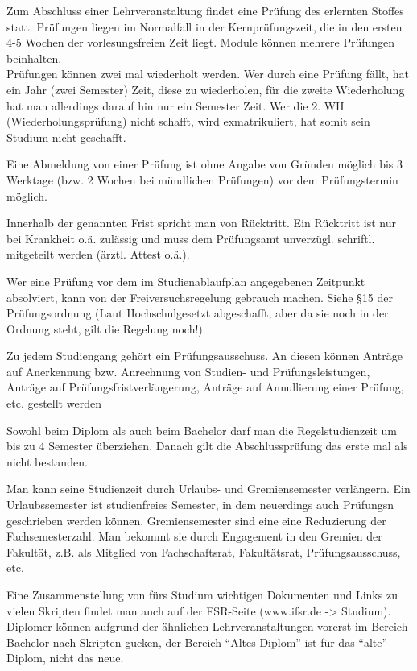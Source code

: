 \documentclass[a4paper,12pt]{report}
\begin{document}
\begin{itemize*}
\item Zum Abschluss einer Lehrveranstaltung findet eine Prüfung des erlernten Stoffes statt. Prüfungen liegen im Normalfall in der Kernprüfungszeit, die in den ersten 4-5 Wochen der vorlesungsfreien Zeit liegt. Module können mehrere Prüfungen beinhalten.\\
Prüfungen können zwei mal wiederholt werden. Wer durch eine Prüfung fällt, hat ein Jahr (zwei Semester) Zeit, diese zu wiederholen, für die zweite Wiederholung hat man allerdings darauf hin nur ein Semester Zeit. Wer die 2. WH (Wiederholungsprüfung) nicht schafft, wird exmatrikuliert, hat somit sein Studium nicht geschafft.
\item Eine Abmeldung von einer Prüfung ist ohne Angabe von Gründen möglich bis 3 Werktage (bzw. 2 Wochen bei mündlichen Prüfungen) vor dem Prüfungstermin möglich.
\item Innerhalb der genannten Frist spricht man von Rücktritt. Ein Rücktritt ist nur bei Krankheit o.ä. zulässig und muss dem Prüfungsamt unverzügl. schriftl. mitgeteilt werden (ärztl. Attest o.ä.).
\item Wer eine Prüfung vor dem im Studienablaufplan angegebenen Zeitpunkt absolviert, kann von der Freiversuchsregelung gebrauch machen. Siehe \S15 der Prüfungsordnung (Laut Hochschulgesetzt abgeschafft, aber da sie noch in der Ordnung steht, gilt die Regelung noch!).
\item Zu jedem Studiengang gehört ein Prüfungsausschuss. An diesen können Anträge auf Anerkennung bzw. Anrechnung von Studien- und Prüfungsleistungen, Anträge auf Prüfungsfristverlängerung, Anträge auf Annullierung einer Prüfung, etc. gestellt werden
\item Sowohl beim Diplom als auch beim Bachelor darf man die Regelstudienzeit um bis zu 4 Semester überziehen. Danach gilt die Abschlussprüfung das erste mal als nicht bestanden.
\item Man kann seine Studienzeit durch Urlaubs- und Gremiensemester verlängern. Ein Urlaubssemester ist studienfreies Semester, in dem neuerdings auch Prüfungsn geschrieben werden können. Gremiensemester sind eine eine Reduzierung der Fachsemesterzahl. Man bekommt sie durch Engagement in den Gremien der Fakultät, z.B. als Mitglied von Fachschaftsrat, Fakultätsrat, Prüfungsausschuss, etc.
\item Eine Zusammenstellung von fürs Studium wichtigen Dokumenten und Links zu vielen Skripten findet man auch auf der FSR-Seite (www.ifsr.de -> Studium). Diplomer können aufgrund der ähnlichen Lehrveranstaltungen vorerst im Bereich Bachelor nach Skripten gucken, der Bereich ``Altes Diplom'' ist für das ``alte'' Diplom, nicht das neue.

\end{itemize*}
\end{document}
